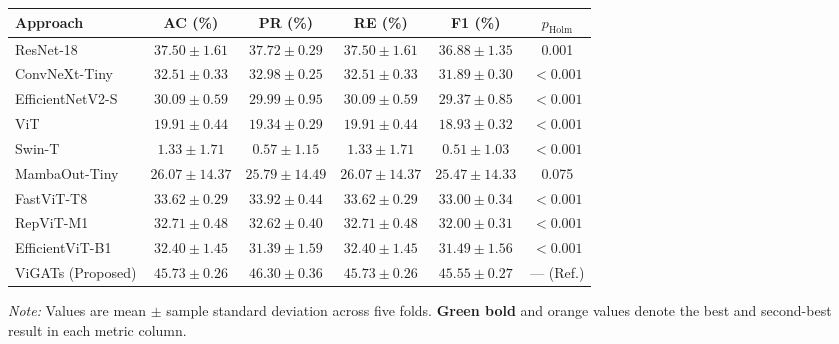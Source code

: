 \documentclass[]{interact}
\theoremstyle{plain}
\theoremstyle{definition}
\theoremstyle{remark}
\newcommand{\bestresult}[1]{\textcolor{bestgreen}{\textbf{#1}}}
\newcommand{\secondresult}[1]{\textcolor{secondorange}{#1}}
\begin{document}
{\begin{table}[H]
\footnotesize
\setlength{\tabcolsep}{3.0pt}
{\begin{tabular}{lccccc} \toprule
\textbf{Approach} & \textbf{AC (\%)} & \textbf{PR (\%)} & \textbf{RE (\%)} & \textbf{F1 (\%)} & \textbf{$p_{\mathrm{Holm}}$} \\ \midrule
ResNet-18 \citep{he2016deep} & \secondresult{$37.50 \pm 1.61$} & \secondresult{$37.72 \pm 0.29$} & \secondresult{$37.50 \pm 1.61$} & \secondresult{$36.88 \pm 1.35$} & 0.001 \\
ConvNeXt-Tiny \citep{liu2022convnext} & $32.51 \pm 0.33$ & $32.98 \pm 0.25$ & $32.51 \pm 0.33$ & $31.89 \pm 0.30$ & $< 0.001$ \\
EfficientNetV2-S \citep{tan2021efficientnetv2} & $30.09 \pm 0.59$ & $29.99 \pm 0.95$ & $30.09 \pm 0.59$ & $29.37 \pm 0.85$ & $< 0.001$ \\
ViT \citep{dosovitskiy2020image} & $19.91 \pm 0.44$ & $19.34 \pm 0.29$ & $19.91 \pm 0.44$ & $18.93 \pm 0.32$ & $< 0.001$ \\
Swin-T \citep{liu2021swin} & $1.33 \pm 1.71$ & $0.57 \pm 1.15$ & $1.33 \pm 1.71$ & $0.51 \pm 1.03$ & $< 0.001$ \\
MambaOut-Tiny \citep{yu2024mambaout} & $26.07 \pm 14.37$ & $25.79 \pm 14.49$ & $26.07 \pm 14.37$ & $25.47 \pm 14.33$ & 0.075 \\
FastViT-T8 \citep{vasu2023fastvit} & $33.62 \pm 0.29$ & $33.92 \pm 0.44$ & $33.62 \pm 0.29$ & $33.00 \pm 0.34$ & $< 0.001$ \\
RepViT-M1 \citep{wang2024repvit} & $32.71 \pm 0.48$ & $32.62 \pm 0.40$ & $32.71 \pm 0.48$ & $32.00 \pm 0.31$ & $< 0.001$ \\
EfficientViT-B1 \citep{cai2023efficientvit} & $32.40 \pm 1.45$ & $31.39 \pm 1.59$ & $32.40 \pm 1.45$ & $31.49 \pm 1.56$ & $< 0.001$ \\
ViGATs (Proposed) & \bestresult{$45.73 \pm 0.26$} & \bestresult{$46.30 \pm 0.36$} & \bestresult{$45.73 \pm 0.26$} & \bestresult{$45.55 \pm 0.27$} & --- (Ref.) \\
\bottomrule
\end{tabular}}
\label{tab:tiny_imagenet}
\parbox{\textwidth}{\vspace{2pt}\footnotesize\textit{Note:} Values are mean $\pm$ sample standard deviation across five folds. \bestresult{Green bold} and \secondresult{orange} values denote the best and second-best result in each metric column.}
\end{table}

}
\end{document}
